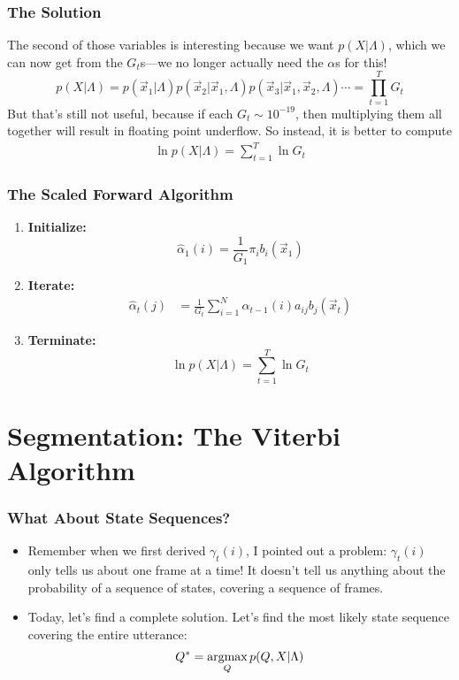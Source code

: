 \documentclass{beamer}
\newcommand{\argmax}{\operatornamewithlimits{argmax}}
\begin{document}
\begin{frame}
  \frametitle{The Solution}

  The second of those variables is interesting because we want $p(X|\Lambda)$, which
  we can now get from the $G_t$s---we no longer actually need the $\alpha$s for this!
  \begin{displaymath}
    p(X|\Lambda) = p(\vec{x}_1|\Lambda )p(\vec{x}_2|\vec{x}_1,\Lambda)p(\vec{x}_3|\vec{x}_1,\vec{x}_2,\Lambda )\cdots= \prod_{t=1}^T G_t
  \end{displaymath}
  But that's still not useful, because if each $G_t\sim 10^{-19}$,
  then multiplying them all together will result in floating point
  underflow.  So instead, it is better to compute
  \begin{align*}
    \ln p(X|\Lambda) = \sum_{t=1}^T \ln G_t
  \end{align*}
\end{frame}

\begin{frame}
  \frametitle{The Scaled Forward Algorithm}

  \begin{enumerate}
  \item {\bf Initialize:}
    \[
    \hat\alpha_1(i) = \frac{1}{G_1}\pi_i b_i(\vec{x}_1)
    \]
  \item {\bf Iterate:}
    \begin{align*}
      \hat\alpha_{t}(j) &=
      \frac{1}{G_t}\sum_{i=1}^N \hat\alpha_{t-1}(i) a_{ij}b_j(\vec{x}_t)
    \end{align*}
  \item {\bf Terminate:}
    \[
    \ln p(X|\Lambda) = \sum_{t=1}^T \ln G_t
    \]
  \end{enumerate}
\end{frame}

\section[Segmentation]{Segmentation: The Viterbi Algorithm}
\setcounter{subsection}{1}

\begin{frame}
  \frametitle{What About State Sequences?}

  \begin{itemize}
  \item Remember when we first derived $\gamma_t(i)$, I pointed out a
    problem: $\gamma_t(i)$ only tells us about one frame at a time!
    It doesn't tell us anything about the probability of a sequence of
    states, covering a sequence of frames.
  \item Today, let's find a complete solution.  Let's find the most
    likely state sequence covering the entire utterance:
    \[
    Q^*  = \argmax_Q p(Q,X|\Lambda)
    \]
  \end{itemize}
\end{frame}
\end{document}
